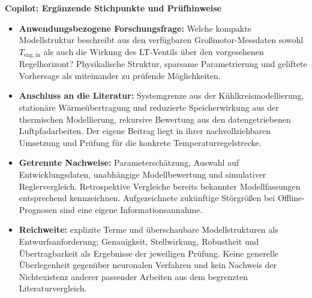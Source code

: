 \par\smallskip
\noindent\textbf{Copilot: Ergänzende Stichpunkte und Prüfhinweise}
\par\smallskip
\begin{itemize}
  \item \textbf{Anwendungsbezogene Forschungsfrage:}
    Welche kompakte Modellstruktur beschreibt aus den verfügbaren
    Großmotor-Messdaten sowohl $T_{\mathrm{eng,in}}$ als auch die
    Wirkung des LT-Ventils über den vorgesehenen Regelhorizont?
    Physikalische Struktur, sparsame Parametrierung und geliftete
    Vorhersage als miteinander zu prüfende Möglichkeiten.
  \item \textbf{Anschluss an die Literatur:}
    Systemgrenze aus der Kühlkreismodellierung, stationäre
    Wärmeübertragung und reduzierte Speicherwirkung aus der
    thermischen Modellierung, rekursive Bewertung aus den
    datengetriebenen Luftpfadarbeiten.
    Der eigene Beitrag liegt in ihrer nachvollziehbaren Umsetzung
    und Prüfung für die konkrete Temperaturregelstrecke.
  \item \textbf{Getrennte Nachweise:}
    Parameterschätzung, Auswahl auf Entwicklungsdaten, unabhängige
    Modellbewertung und simulativer Reglervergleich.
    Retrospektive Vergleiche bereits bekannter Modellfassungen
    entsprechend kennzeichnen. Aufgezeichnete zukünftige
    Störgrößen bei Offline-Prognosen sind eine eigene
    Informationsannahme.
  \item \textbf{Reichweite:}
    explizite Terme und überschaubare Modellstrukturen als
    Entwurfsanforderung; Genauigkeit, Stellwirkung, Robustheit und
    Übertragbarkeit als Ergebnisse der jeweiligen Prüfung.
    Keine generelle Überlegenheit gegenüber neuronalen Verfahren
    und kein Nachweis der Nichtexistenz anderer passender Arbeiten
    aus dem begrenzten Literaturvergleich.
\end{itemize}
